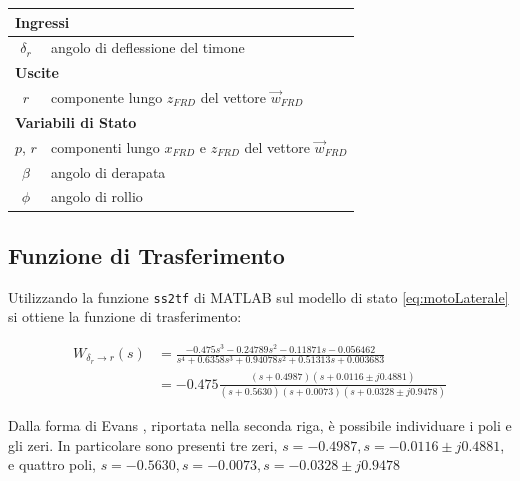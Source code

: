 \renewcommand{\arraystretch}{1.2}
\begin{table}[H]
    \begin{tabularx}{\textwidth}{|c|X|}
        \hline
        \multicolumn{2}{|l|}{\textbf{Ingressi}}                                         \\
        \hline
        $\delta_r$ & angolo di deflessione del timone                                   \\
        \hline
        \multicolumn{2}{|l|}{\textbf{Uscite}}                                           \\
        \hline
        $r$        & componente lungo $z_{FRD}$ del vettore $\vec{w}_{FRD}$             \\
        \hline
        \multicolumn{2}{|l|}{\textbf{Variabili di Stato}}                               \\
        \hline
        $p$, $r$   & componenti lungo $x_{FRD}$ e $z_{FRD}$ del vettore $\vec{w}_{FRD}$ \\
        $\beta$    & angolo di derapata                                                 \\
        $\phi$     & angolo di rollio                                                   \\
        \hline
    \end{tabularx}
\end{table}

\subsection{Funzione di Trasferimento}
Utilizzando la funzione \texttt{ss2tf} di MATLAB sul modello di stato \eqref{eq:motoLaterale} si ottiene la funzione di trasferimento:

\begin{equation}
    \label{eq:trasferimentoLaterali}
    \begin{split}
        W_{\delta_r \rightarrow r}(s) & = \frac{-0.475 s^3 - 0.24789 s^2 - 0.11871 s - 0.056462}{s^4 + 0.6358 s^3 + 0.94078 s^2 + 0.51313 s + 0.003683} \\
                                      & = -0.475\frac{(s + 0.4987)(s + 0.0116 \pm j0.4881)}{(s + 0.5630)(s + 0.0073)(s + 0.0328 \pm j0.9478)}
    \end{split}
\end{equation}

Dalla forma di Evans \cite{zampieri_dispensa_controlli}, riportata nella seconda riga, è possibile individuare i poli e gli zeri. In particolare sono presenti tre zeri, $s = -0.4987, s = - 0.0116 \pm j0.4881$, e quattro poli, $s = -0.5630, s = -0.0073, s = -0.0328 \pm j0.9478$


